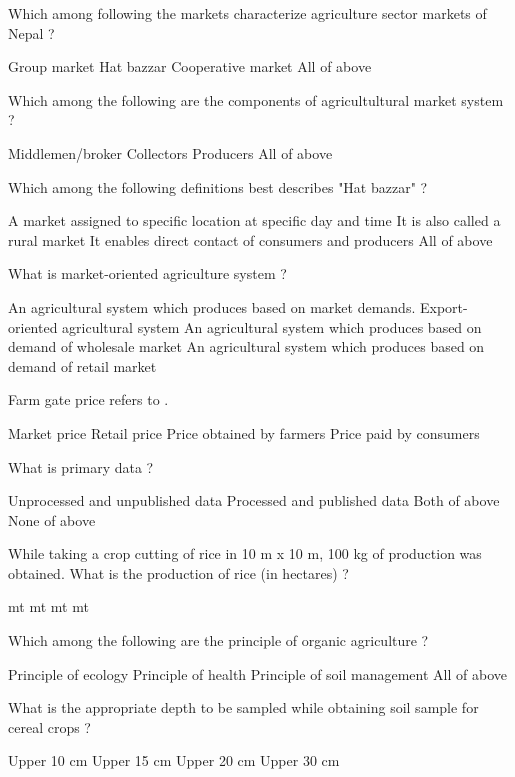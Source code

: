 \begin{questions}
\question Which among following the markets characterize agriculture sector markets of Nepal ?
  \begin{choices}
  \choice Group market
  \choice Hat bazzar
  \choice Cooperative market
  \choice All of above
  \end{choices}

\question Which among the following are the components of agricultultural market system ?
  \begin{choices}
  \choice Middlemen/broker
  \choice Collectors
  \choice Producers
  \CorrectChoice All of above
  \end{choices}

\question Which among the following definitions best describes "Hat bazzar" ?
  \begin{choices}
  \choice A market assigned to specific location at specific day and time
  \choice It is also called a rural market
  \choice It enables direct contact of consumers and producers
  \choice All of above
  \end{choices}

\question What is market-oriented agriculture system ?
  \begin{choices}
  \choice An agricultural system which produces based on market demands.
  \choice Export-oriented agricultural system
  \choice An agricultural system which produces based on demand of wholesale market
  \choice An agricultural system which produces based on demand of retail market
  \end{choices}

\question Farm gate price refers to \fillin[][3cm].
  \begin{choices}
  \choice Market price
  \choice Retail price
  \CorrectChoice Price obtained by farmers
  \choice Price paid by consumers
  \end{choices}

\question What is primary data ?
\begin{choices}
\CorrectChoice Unprocessed and unpublished data
\choice Processed and published data
\choice Both of above
\choice None of above
\end{choices}

\question While taking a crop cutting of rice in 10 m x 10 m, 100 kg of production was obtained. What is the production of rice (in hectares) ?
\begin{choices}
 mt
 mt
 mt
 mt
\end{choices}

\question Which among the following are the principle of organic agriculture ?
\begin{choices}
\choice Principle of ecology
\choice Principle of health
\choice Principle of soil management
\choice All of above
\end{choices}

\question What is the appropriate depth to be sampled while obtaining soil sample for cereal crops ?
\begin{choices}
\choice Upper 10 cm
\choice Upper 15 cm
\choice Upper 20 cm
\choice Upper 30 cm
\end{choices}

\end{questions}
